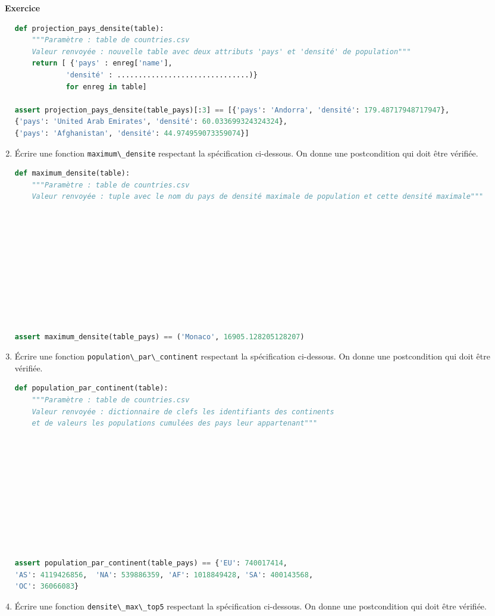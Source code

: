 \documentclass[
  11pt,
]{article}
\newcommand{\passthrough}[1]{#1}
\newcounter{exo}
\newenvironment{exercice}[1]
{\par \medskip   \addtocounter{exo}{1} \noindent  
\begin{bclogo}[arrondi =0.1,   noborder = true, logo=\bccrayon, marge=4]{~\textbf{Exercice} \textbf{\theexo} {\itshape #1} }  \par}
{
\end{bclogo}
 \par \bigskip }
\newcounter{def}
\begin{document}
\begin{exercice}{}
\begin{enumerate}
\begin{lstlisting}[language=Python]
def projection_pays_densite(table):
    """Paramètre : table de countries.csv
    Valeur renvoyée : nouvelle table avec deux attributs 'pays' et 'densité' de population"""
    return [ {'pays' : enreg['name'], 
            'densité' : ...............................)}
            for enreg in table]

assert projection_pays_densite(table_pays)[:3] == [{'pays': 'Andorra', 'densité': 179.48717948717947},
{'pays': 'United Arab Emirates', 'densité': 60.033699324324324},
{'pays': 'Afghanistan', 'densité': 44.974959073359074}]
\end{lstlisting}
\item
  Écrire une fonction \passthrough{\lstinline!maximum\_densite!}
  respectant la spécification ci-dessous. On donne une postcondition qui
  doit être vérifiée.

\begin{lstlisting}[language=Python]
def maximum_densite(table):
    """Paramètre : table de countries.csv
    Valeur renvoyée : tuple avec le nom du pays de densité maximale de population et cette densité maximale"""











assert maximum_densite(table_pays) == ('Monaco', 16905.128205128207)
\end{lstlisting}
\item
  Écrire une fonction
  \passthrough{\lstinline!population\_par\_continent!} respectant la
  spécification ci-dessous. On donne une postcondition qui doit être
  vérifiée.

\begin{lstlisting}[language=Python]
def population_par_continent(table):
    """Paramètre : table de countries.csv
    Valeur renvoyée : dictionnaire de clefs les identifiants des continents
    et de valeurs les populations cumulées des pays leur appartenant"""











assert population_par_continent(table_pays) == {'EU': 740017414,
'AS': 4119426856,  'NA': 539886359, 'AF': 1018849428, 'SA': 400143568, 
'OC': 36066083}
\end{lstlisting}
\item
  Écrire une fonction \passthrough{\lstinline!densite\_max\_top5!}
  respectant la spécification ci-dessous. On donne une postcondition qui
  doit être vérifiée.


\end{enumerate}
\end{exercice}
\end{document}
